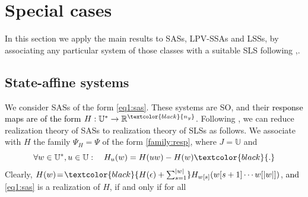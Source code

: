 \documentclass[journal,twoside,web]{ieeecolor}
\begin{document}
\section{Special cases} %

In this section we apply the main results to  SASs, LPV-SSAs and LSSs, by associating any particular system of those classes with a suitable SLS following \cite{Son:Real},\cite{Petreczky2016}.

\subsection{State-affine systems}
  We consider SASs of the form \eqref{eq1:sas}. These systems are SO, and their %
  \textcolor{black}{response maps are of the form} $H:\mathbb{U}^{*} \rightarrow \mathbb{R}^{\textcolor{black}{n_y}}$.
  Following \cite{Son:Real}, we can reduce realization theory of SASs to realization theory of SLSs as follows. 
   We associate with $H$ the 
   family $\Psi_H=\Psi$ of the form
   \eqref{family:resp}, where 
   $J=\mathbb{U}$ and 
   \begin{equation}
   \label{def:hu}
     \forall w \in \mathbb{U}^{*}, u \in \mathbb{U}: \quad H_u(w)=H(uw)-H(w) \textcolor{black}{.}
   \end{equation}
    Clearly, 
    $H(w)\!=\!\textcolor{black}{H(\epsilon)+\sum_{s=1}^{|w|}} H_{w[s]}(w[s+1]\cdots w[|w|])$, \textcolor{black}{and}
    \eqref{eq1:sas} is a realization of $H$, if and only if for all 
\end{document}
